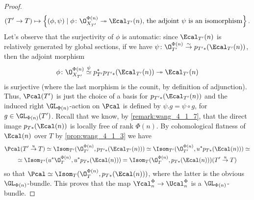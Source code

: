 \begin{proof}
            \[(T' \to T) \mapsto \left\{(\phi, \psi) \mid \phi\colon \O_{X_{T'}}^{\Phi(n)} \twoheadrightarrow \Ecal_{T'}(n),\, \text{the adjoint $\psi$ is an isomorphism}  \right\}. \] Let's observe that the surjectivity of $\phi$ is automatic: since $\Ecal_{T'}(n)$ is relatively generated by global sections, if we have $\psi\colon \O_{T'}^{\Phi(n)} \stackrel{\sim}{\to} p_{T'*}(\Ecal_{T'}(n))$, then the adjoint morphism \[\phi\colon \O_{X_{T'}}^{\Phi(n)} \stackrel{\psi}{\simeq} p_{T'}^*p_{T'*}(\Ecal_{T'}(n)) \twoheadrightarrow \Ecal_{T'}(n) \] is surjective (where the last morphism is the counit, by definition of adjunction). Thus, $\Pcal(T')$ is just the choice of a basis for $p_{T'*}(\Ecal_{T'}(n))$ and the induced right $\GL_{\Phi(n)}$-action on $\Pcal$ is defined by $\psi.g = \psi \circ g$, for $g \in \GL_{\Phi(n)}(T')$. Recall that we know, by \cref{remark:wang_4_1_7}, that the direct image $p_{T*}(\Ecal(n))$ is locally free of rank $\Phi(n)$. By cohomological flatness of $\Ecal(n)$ over $T$ by \cref{prop:wang_4_1_3} we have 
            \begin{gather*}
                \Pcal(T' \stackrel{u}{\to} T) \simeq \Isom_{T'}(\O_{T'}^{\Phi(n)}, p_{T'*}(\Ecal_{T'}(n))) \simeq \Isom_{T'}(\O_{T'}^{\Phi(n)}, u^*p_{T*}(\Ecal(n))) \simeq \\
                \simeq \Isom_{T'}(u^*\O_T^{\Phi(n)}, u^*p_{T*}(\Ecal(n))) = \Isom_T(\O_T^{\Phi(n)}, p_{T*}(\Ecal(n)))(T' \stackrel{u}{\to} T) 
            \end{gather*} 
            so that $\Pcal \simeq \Isom_T(\O_T^{\Phi(n)}, p_{T*}(\Ecal(n)))$, where the latter is the obvious $\GL_{\Phi(n)}$-bundle.
            This proves that the map $\Ycal_n^{\Phi} \to \Ucal_n^{\Phi}$ is a $\GL_{\Phi(n)}$-bundle.
        \end{proof}

